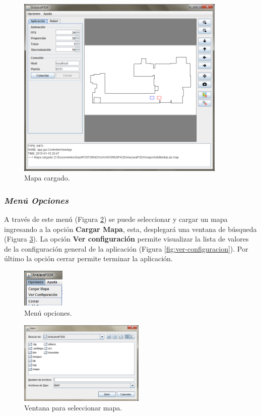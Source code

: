 \documentclass[11pt,twoside,A5]{article}
\newcommand{\reffigure}[1]{Figura \ref{#1}}
\newcommand{\refpfigure}[1]{(\reffigure{#1})}
\begin{document}
\begin{figure}[H]
\begin{center}
\includegraphics[width=10cm]{mapa-cargado.png} 
\caption{Mapa cargado.}
\label{fig:mapa-cargado}
\end{center}
\end{figure} 


\subsubsection*{\textit{Menú Opciones}}

A través de este menú \refpfigure{fig:menu-opciones} se puede seleccionar y cargar un mapa ingresando 
a la opción \textbf{Cargar Mapa}, esta, desplegará una ventana de búsqueda \refpfigure{fig:cargar-mapa}.
La opción \textbf{Ver configuración} permite visualizar la lista de valores de la configuración general de la aplicación \refpfigure{fig:ver-configuracion}. Por último la opción cerrar permite terminar la aplicación.

\begin{figure}[H]
\begin{center}
\includegraphics[width=2cm]{menu-opciones2.png} 
\caption{Menú opciones.}
\label{fig:menu-opciones}
\end{center}
\end{figure} 

\begin{figure}[H]
\begin{center}
\includegraphics[width=6cm]{cargar-mapa.png} 
\caption{Ventana para seleccionar mapa.}
\label{fig:cargar-mapa}
\end{center}
\end{figure} 
\end{document}
